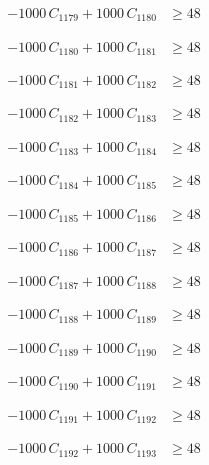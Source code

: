 \documentclass[a4paper,11pt]{article}
\begin{document}
\begin{align}
-1000\,C_{1179} + 1000\,C_{1180} &\geq 48 \nonumber
\end{align}

\begin{align}
-1000\,C_{1180} + 1000\,C_{1181} &\geq 48 \nonumber
\end{align}

\begin{align}
-1000\,C_{1181} + 1000\,C_{1182} &\geq 48 \nonumber
\end{align}

\begin{align}
-1000\,C_{1182} + 1000\,C_{1183} &\geq 48 \nonumber
\end{align}

\begin{align}
-1000\,C_{1183} + 1000\,C_{1184} &\geq 48 \nonumber
\end{align}

\begin{align}
-1000\,C_{1184} + 1000\,C_{1185} &\geq 48 \nonumber
\end{align}

\begin{align}
-1000\,C_{1185} + 1000\,C_{1186} &\geq 48 \nonumber
\end{align}

\begin{align}
-1000\,C_{1186} + 1000\,C_{1187} &\geq 48 \nonumber
\end{align}

\begin{align}
-1000\,C_{1187} + 1000\,C_{1188} &\geq 48 \nonumber
\end{align}

\begin{align}
-1000\,C_{1188} + 1000\,C_{1189} &\geq 48 \nonumber
\end{align}

\begin{align}
-1000\,C_{1189} + 1000\,C_{1190} &\geq 48 \nonumber
\end{align}

\begin{align}
-1000\,C_{1190} + 1000\,C_{1191} &\geq 48 \nonumber
\end{align}

\begin{align}
-1000\,C_{1191} + 1000\,C_{1192} &\geq 48 \nonumber
\end{align}

\begin{align}
-1000\,C_{1192} + 1000\,C_{1193} &\geq 48 \nonumber
\end{align}
\end{document}
